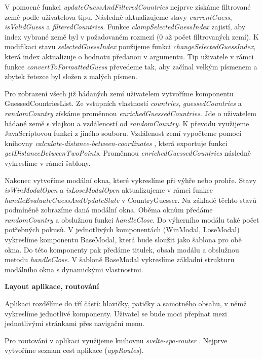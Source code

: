 V pomocné funkci \emph{updateGuessAndFilteredCountries} nejprve získáme filtrované země podle uživatelova tipu. Následně aktualizujeme stavy \emph{currentGuess}, \emph{isValidGuess} a \emph{filteredCountries}. 
Funkce \emph{clampSelectedGuessIndex} zajistí, aby index vybrané země byl v požadovaném rozmezí (0 až počet filtrovaných zemí). 
K modifikaci stavu \emph{selectedGuessIndex} použijeme funkci \emph{changeSelectedGuessIndex}, která index aktualizuje o hodnotu předanou v argumentu. 
Tip uživatele v rámci funkce \emph{convertToFormattedGuess} převedeme tak, aby začínal velkým písmenem a zbytek řetezce byl složen z malých písmen.

Pro zobrazení všech již hádaných zemí uživatelem vytvoříme komponentu GuessedCountriesList. 
Ze vstupních vlastností \emph{countries}, \emph{guessedCountries} a \emph{randomCountry} získáme proměnnou \emph{enrichedGuessedCountries}. 
Jde o uživatelem hádané země s vlajkou a vzdáleností od \emph{randomCountry}. K převodu využijeme JavaScriptovou funkci z jiného souboru. 
Vzdálenost zemí vypočteme pomocí knihovny \emph{calculate-distance-between-coordinates} \cite{distancebetweencoordinates}, která exportuje funkci \emph{getDistanceBetweenTwoPoints}. 
Proměnnou \emph{enrichedGuessedCountries} následně vykreslíme v rámci šablony.

Nakonec vytvoříme modální okna, které vykreslíme při výhře nebo prohře. Stavy \emph{isWinModalOpen} a \emph{isLoseModalOpen} aktualizujeme v rámci funkce \emph{handleEvaluateGuessAndUpdateState} v CountryGuesser. 
Na základě těchto stavů podmíněně zobrazíme daná modální okna. Oběma oknům předáme \emph{randomCountry} a obslužnou funkci \emph{handleClose}. Do výherního modálu také počet potřebných pokusů. 
V jednotlivých komponentách (WinModal, LoseModal) vykreslíme komponentu BaseModal, která bude sloužit jako šablona pro obě okna. Do této komponenty pak předáme titulek, obsah modálu a obslužnou metodu \emph{handleClose}. 
V šabloně BaseModal vykreslíme základní strukturu modálního okna s dynamickými vlastnostmi.

\begin{flushleft}
  \textbf{Layout aplikace, routování}
\end{flushleft}

Aplikaci rozdělíme do tří částí: hlavičky, patičky a samotného obsahu, v němž vykreslíme jednotlivé komponenty. Uživatel se bude moci přepínat mezi jednotlivými stránkami přes navigační menu. 

Pro routování v aplikaci využijeme knihovnu \emph{svelte-spa-router} \cite{sveltesparouterlib}. Nejprve vytvoříme seznam cest aplikace (\emph{appRoutes}).

